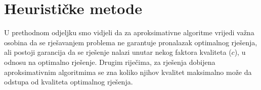 \documentclass[b5paper, utf8, 11pt, colorlinks]{book}
\theoremstyle{definition}
\begin{document}

  
\section{Heurističke metode}
 U prethodnom odjeljku smo vidjeli da za aproksimativne algoritme vrijedi važna osobina da se rješavanjem problema ne garantuje pronalazak optimalnog rješenja, ali postoji garancija da se rješenje nalazi unutar nekog faktora kvaliteta ($c$), u odnosu na optimalno rješenje.  
 Drugim riječima, za rješenja dobijena aproksimativnim algoritmima se zna koliko njihov kvalitet maksimalno može da odstupa od kvaliteta optimalnog rješenja. 
 
\end{document}
